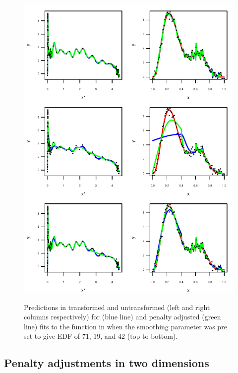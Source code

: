 \begin{figure}
\centering
\includegraphics[width=5.5in]{mds/figs/1dedfdia.pdf} \\
\caption{Predictions in transformed and untransformed (left and right columns respectively) for \tprs (blue line) and penalty adjusted \tprs (green line) fits to the function in  when the smoothing parameter was pre set to give EDF of 71, 19, and 42 (top to bottom).}
\label{1dedfdia}
\end{figure}


\subsection{Penalty adjustments in two dimensions}

